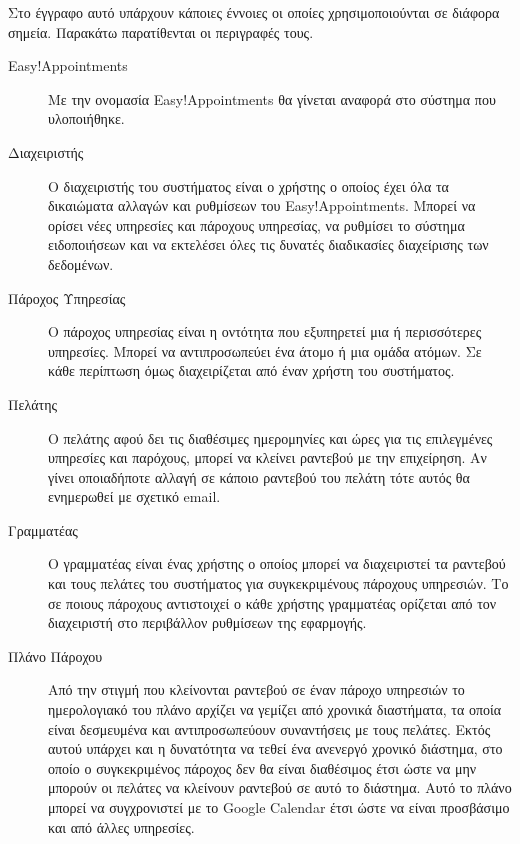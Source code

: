 \begin{Definitions}
Στο έγγραφο αυτό υπάρχουν κάποιες έννοιες οι οποίες χρησιμοποιούνται 
σε διάφορα σημεία. Παρακάτω παρατίθενται οι περιγραφές τους.
\begin{description}
\item [Easy!Appointments] Με την ονομασία Easy!Appointments θα γίνεται αναφορά στο σύστημα που υλοποιήθηκε.

\item [Διαχειριστής] Ο διαχειριστής του συστήματος είναι ο χρήστης ο οποίος έχει όλα τα δικαιώματα αλλαγών και ρυθμίσεων του Easy!Appointments. Μπορεί να ορίσει νέες υπηρεσίες και πάροχους υπηρεσίας, να ρυθμίσει το σύστημα ειδοποιήσεων και να εκτελέσει όλες τις δυνατές διαδικασίες διαχείρισης των δεδομένων.

\item [Πάροχος Υπηρεσίας] Ο πάροχος υπηρεσίας είναι η οντότητα που εξυπηρετεί μια ή περισσότερες υπηρεσίες. Μπορεί να αντιπροσωπεύει ένα άτομο ή μια ομάδα ατόμων. Σε κάθε περίπτωση όμως διαχειρίζεται από έναν χρήστη του συστήματος.

\item [Πελάτης] Ο πελάτης αφού δει τις διαθέσιμες ημερομηνίες και ώρες για τις επιλεγμένες υπηρεσίες και παρόχους, μπορεί να κλείνει ραντεβού με την επιχείρηση. Αν γίνει οποιαδήποτε αλλαγή σε κάποιο ραντεβού του πελάτη τότε αυτός θα ενημερωθεί με σχετικό email.

\item [Γραμματέας] Ο γραμματέας είναι ένας χρήστης ο οποίος μπορεί να διαχειριστεί τα ραντεβού και τους πελάτες του συστήματος για συγκεκριμένους πάροχους υπηρεσιών. Το σε ποιους πάροχους αντιστοιχεί ο κάθε χρήστης γραμματέας ορίζεται από τον διαχειριστή στο περιβάλλον ρυθμίσεων της εφαρμογής.

\item [Πλάνο Πάροχου] Από την στιγμή που κλείνονται ραντεβού σε έναν πάροχο υπηρεσιών το ημερολογιακό του πλάνο αρχίζει να γεμίζει από χρονικά διαστήματα, τα οποία είναι δεσμευμένα και αντιπροσωπεύουν συναντήσεις με τους πελάτες. Εκτός αυτού υπάρχει και η δυνατότητα να τεθεί ένα ανενεργό χρονικό διάστημα, στο οποίο ο συγκεκριμένος πάροχος δεν θα είναι διαθέσιμος έτσι ώστε να μην μπορούν οι πελάτες να κλείνουν ραντεβού σε αυτό το διάστημα. Αυτό το πλάνο μπορεί να συγχρονιστεί με το Google Calendar έτσι ώστε να είναι προσβάσιμο και από άλλες υπηρεσίες. 

\end{description}
\end{Definitions}

